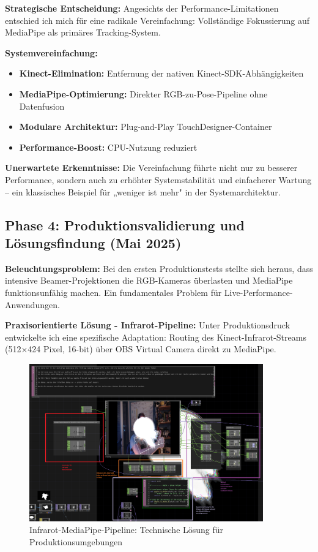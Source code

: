 \textbf{Strategische Entscheidung:}
Angesichts der Performance-Limitationen entschied ich mich für eine radikale Vereinfachung: Vollständige Fokussierung auf MediaPipe als primäres Tracking-System.

\textbf{Systemvereinfachung:}
\begin{itemize}
    \item \textbf{Kinect-Elimination:} Entfernung der nativen Kinect-SDK-Abhängigkeiten
    \item \textbf{MediaPipe-Optimierung:} Direkter RGB-zu-Pose-Pipeline ohne Datenfusion
    \item \textbf{Modulare Architektur:} Plug-and-Play TouchDesigner-Container
    \item \textbf{Performance-Boost:} CPU-Nutzung reduziert
\end{itemize}

\textbf{Unerwartete Erkenntnisse:}
Die Vereinfachung führte nicht nur zu besserer Performance, sondern auch zu erhöhter Systemstabilität und einfacherer Wartung – ein klassisches Beispiel für „weniger ist mehr" in der Systemarchitektur.

\subsection{Phase 4: Produktionsvalidierung und Lösungsfindung (Mai 2025)}

\textbf{Beleuchtungsproblem:}
Bei den ersten Produktionstests stellte sich heraus, dass intensive Beamer-Projektionen die RGB-Kameras überlasten und MediaPipe funktionsunfähig machen. Ein fundamentales Problem für Live-Performance-Anwendungen.

\textbf{Praxisorientierte Lösung - Infrarot-Pipeline:}
Unter Produktionsdruck entwickelte ich eine spezifische Adaptation: Routing des Kinect-Infrarot-Streams (512×424 Pixel, 16-bit) über OBS Virtual Camera direkt zu MediaPipe.

\begin{figure}[H]
    \centering
    \includegraphics[width=0.9\textwidth]{images/docupictures/TopDown_KreisZuRampsParametisierteBerechnungen.png}
    \caption{Infrarot-MediaPipe-Pipeline: Technische Lösung für Produktionsumgebungen}
    \label{fig:infrared_solution}
\end{figure}

